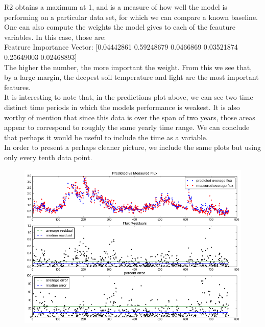 \documentclass{article}
\begin{document}
R2 obtains a maximum at 1, and is a measure of how well the model is performing on a particular data set, for which we can compare a known baseline. \\

One can also compute the weights the model gives to each of the feauture variables. In this case, those are: \\

Featrure Importance Vector: [0.04442861  0.59248679  0.0466869   0.03521874  0.25649003  0.02468893] \\

The higher the number, the more important the weight. From this we see that, by a large margin, the deepest soil temperature and light are the most important features. \\

It is interesting to note that, in the predictions plot above, we can see two time distinct time periods in which the models performance is weakest. It is also worthy of mention that since this data is over the span of two years, those areas appear to correspond to roughly the same yearly time range. We can conclude that perhaps it would be useful to include the time as a variable. \\

In order to present a perhaps cleaner picture, we include the same plots but using only every tenth data point.

\begin{figure}[H]
	\includegraphics[width=\textwidth, height=\textheight, keepaspectratio]{rf1_small.png}
\end{figure}
\end{document}
